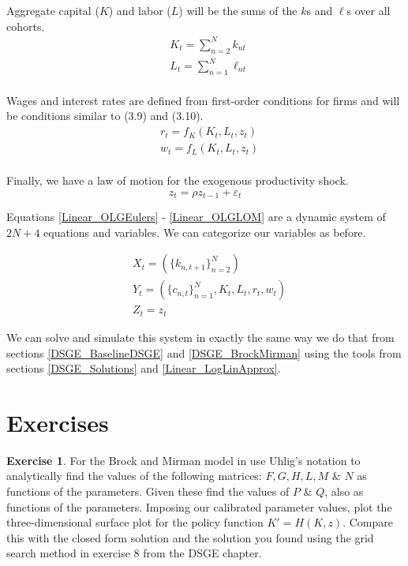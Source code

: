 \documentclass[letterpaper,12pt]{article}
\newcommand{\ve}{\varepsilon}
\theoremstyle{definition}
\newtheorem{exercise}[theorem]{Exercise}
\begin{document}
\begin{spacing}{1.5}
	Aggregate capital ($K$) and labor ($L$) will be the sums of the $k$s and $\ell$s over all cohorts.
	\begin{equation}\label{Linear_OLGKL}
	\begin{split}
	& K_t = \sum_{n=2}^N k_{nt} \\
	& L_t = \sum_{n=1}^N \ell_{nt} \\
	\end{split}
	\end{equation}

	Wages and interest rates are defined from first-order conditions for firms and will be conditions similar to (3.9) and (3.10).
	\begin{equation}\label{Linear_OLGrw}
	\begin{split}
	& r_t = f_K(K_t,L_t,z_t) \\
	& w_t = f_L(K_t,L_t,z_t) \\
	\end{split}
	\end{equation}

	Finally, we have a law of motion for the exogenous productivity shock.
	\begin{equation}\label{Linear_OLGLOM}
	z_t = \rho z_{t-1} + \ve_t
	\end{equation}

	Equations \eqref{Linear_OLGEulers} - \eqref{Linear_OLGLOM} are a dynamic system of $2N+4$ equations and variables.  We can categorize our variables as before.

	\begin{equation}
	\begin{split}
	&X_t = (\{k_{n,t+1}\}_{n=2}^N) \\
	&Y_t = (\{c_{n,t}\}_{n=1}^N,K_t,L_t,r_t,w_t) \\
	&Z_t = z_t
	\end{split}
	\end{equation}

	We can solve and simulate this system in exactly the same way we do that from sections \ref{DSGE_BaselineDSGE} and \ref{DSGE_BrockMirman} using the tools from sections \ref{DSGE_Solutions} and \ref{Linear_LogLinApprox}.

\newpage
\section*{Exercises}\label{Linear_HW}

	\begin{exercise} \label{Linear_HW_BM_Coeffs}
		For the Brock and Mirman model in use Uhlig's notation to analytically find the values of the following matrices: $F, G, H, L, M$ \& $N$ as functions of the parameters.  Given these find the values of $P$ \& $Q$, also as functions of the parameters.  Imposing our calibrated parameter values, plot the three-dimensional surface plot for the policy function $K' = H(K,z)$.  Compare this with the closed form solution and the solution you found using the grid search method in exercise 8 from the DSGE chapter.
	\end{exercise}


\end{spacing}
\end{document}
